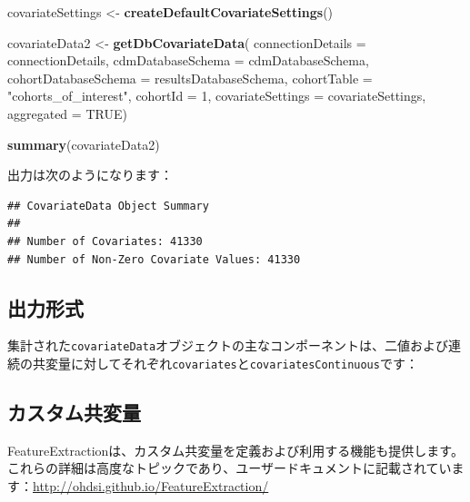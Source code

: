 \documentclass[
  11pt]{book}
\newenvironment{Shaded}{\begin{snugshade}}{\end{snugshade}}
\newcommand{\AttributeTok}[1]{\textcolor[rgb]{0.13,0.29,0.53}{#1}}
\newcommand{\ConstantTok}[1]{\textcolor[rgb]{0.56,0.35,0.01}{#1}}
\newcommand{\DecValTok}[1]{\textcolor[rgb]{0.00,0.00,0.81}{#1}}
\newcommand{\FunctionTok}[1]{\textcolor[rgb]{0.13,0.29,0.53}{\textbf{#1}}}
\newcommand{\NormalTok}[1]{#1}
\newcommand{\OtherTok}[1]{\textcolor[rgb]{0.56,0.35,0.01}{#1}}
\newcommand{\SpecialCharTok}[1]{\textcolor[rgb]{0.81,0.36,0.00}{\textbf{#1}}}
\newcommand{\StringTok}[1]{\textcolor[rgb]{0.31,0.60,0.02}{#1}}
\theoremstyle{definition}
\theoremstyle{definition}
\theoremstyle{definition}
\theoremstyle{definition}
\theoremstyle{remark}
\begin{document}
\begin{Shaded}
\begin{Highlighting}[]
\NormalTok{covariateSettings }\OtherTok{\textless{}{-}} \FunctionTok{createDefaultCovariateSettings}\NormalTok{()}

\NormalTok{covariateData2 }\OtherTok{\textless{}{-}} \FunctionTok{getDbCovariateData}\NormalTok{(}
  \AttributeTok{connectionDetails =}\NormalTok{ connectionDetails,}
  \AttributeTok{cdmDatabaseSchema =}\NormalTok{ cdmDatabaseSchema,}
  \AttributeTok{cohortDatabaseSchema =}\NormalTok{ resultsDatabaseSchema,}
  \AttributeTok{cohortTable =} \StringTok{"cohorts\_of\_interest"}\NormalTok{,}
  \AttributeTok{cohortId =} \DecValTok{1}\NormalTok{,}
  \AttributeTok{covariateSettings =}\NormalTok{ covariateSettings,}
  \AttributeTok{aggregated =} \ConstantTok{TRUE}\NormalTok{)}

\FunctionTok{summary}\NormalTok{(covariateData2)}
\end{Highlighting}
\end{Shaded}

出力は次のようになります：

\begin{verbatim}
## CovariateData Object Summary
##
## Number of Covariates: 41330
## Number of Non-Zero Covariate Values: 41330
\end{verbatim}

\subsection{出力形式}\label{ux51faux529bux5f62ux5f0f}

集計された\texttt{covariateData}オブジェクトの主なコンポーネントは、二値および連続の共変量に対してそれぞれ\texttt{covariates}と\texttt{covariatesContinuous}です：

\begin{Shaded}
\end{Shaded}

\subsection{カスタム共変量}\label{ux30abux30b9ux30bfux30e0ux5171ux5909ux91cf}

FeatureExtractionは、カスタム共変量を定義および利用する機能も提供します。これらの詳細は高度なトピックであり、ユーザードキュメントに記載されています：\url{http://ohdsi.github.io/FeatureExtraction/}
\end{document}

